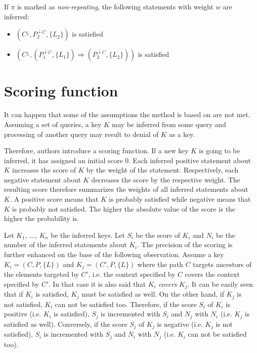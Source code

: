 If $\pi$ is marked as \emph{non-repeating}, the following statements with weight $w$ are inferred:
\begin{itemize}
\item $(C^{\downarrow}, P_2^{\downarrow C}, \{L_2\})$ is satisfied
\item $(C^{\downarrow}, (P_1^{\downarrow C}, \{L_1\}) \Rightarrow (P_2^{\downarrow C}, \{L_2\}))$ is satisfied
\end{itemize}

\section{Scoring function}
It can happen that some of the assumptions the method is based on are not met. Assuming a set of queries, a key $K$ may be inferred from some query and processing of another query may result to denial of $K$ as a key. 

Therefore, authors introduce a scoring function. If a new key $K$ is going to be inferred, it has assigned an initial score 0. Each inferred positive statement about $K$ increases the score of $K$ by the weight of the statement. Respectively, each negative statement about $K$ decreases the score by the respective weight. The resulting score therefore summarizes the weights of all inferred statements about $K$. A positive score means that $K$ is probably satisfied while negative means that $K$ is probably not satisfied. The higher the absolute value of the score is the higher the probability is.

Let $K_1$, ..., $K_n$ be the inferred keys. Let $S_i$ be the score of $K_i$ and $N_i$ be the number of the inferred statements about $K_i$. The precision of the scoring is further enhanced on the base of the following observation. Assume a key $K_i = (C, P, \{L\})$ and $K_j = (C' , P, \{L\})$ where the path $C$ targets ancestors of the elements targeted by $C'$, i.e. the context specified by $C$ covers the context specified by $C'$. In that case it is also said that $K_i$ \emph{covers} $K_j$. It can be easily seen that if $K_i$ is satisfied, $K_j$ must be satisfied as well. On the other hand, if $K_j$ is not satisfied, $K_i$ can not be satisfied too. Therefore, if the score $S_i$ of $K_i$ is positive (i.e. $K_i$ is satisfied), $S_j$ is incremented with $S_i$ and $N_j$ with $N_i$ (i.e. $K_j$ is satisfied as well). Conversely, if the score $S_j$ of $K_j$ is negative (i.e. $K_j$ is not satisfied), $S_i$ is incremented with $S_j$ and $N_i$ with $N_j$ (i.e. $K_i$ can not be satisfied too).

